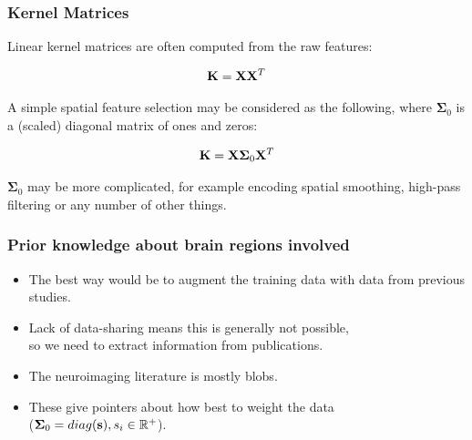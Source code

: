 \begin{frame}
\begin{columns}[c]
\end{columns}
\end{frame}


\begin{frame}
\frametitle{Kernel Matrices}
Linear kernel matrices are often computed from the raw features:\par
\begin{Large}
\begin{eqnarray*}
{\bf K} = {\bf X}{\bf X}^T
\end{eqnarray*}
\end{Large}
A simple spatial feature selection may be considered as the following, where $\boldsymbol\Sigma_0$ is a (scaled) diagonal matrix of ones and zeros:\par
\begin{Large}
\begin{eqnarray*}
{\bf K} = {\bf X}\boldsymbol\Sigma_0{\bf X}^T
\end{eqnarray*}
\end{Large}
$\boldsymbol\Sigma_0$ may be more complicated, for example encoding spatial smoothing, high-pass filtering or any number of other things.\par
\end{frame}

\begin{frame}
\frametitle{Prior knowledge about brain regions involved}
\begin{itemize}
\item The best way would be to augment the training data with data from previous studies.
\item Lack of data-sharing means this is generally not possible,\\
      so we need to extract information from publications.
\item The neuroimaging literature is mostly blobs.
\item These give pointers about how best to weight the data\\
      ($\boldsymbol\Sigma_0 = diag({\bf s}), s_i \in \mathbb{R}^+$).
\end{itemize}
\end{frame}


